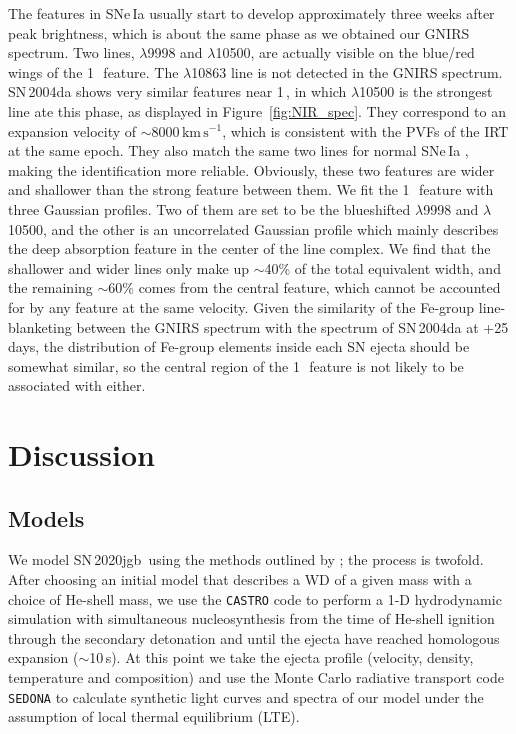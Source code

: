 \documentclass[twocolumn]{aastex631}
\newcommand{\sn}{SN\,2020jgb}
\newcommand{\kms}{$\mathrm{km}\,\mathrm{s}^{-1}$}
\newcommand{\adam}[1]{\textcolor{red}{[AAM: #1]}}
\newcommand{\chang}[1]{\textcolor{blue}{[Chang: #1]}}
\begin{document}
The  features in SNe\,Ia usually start to develop approximately three weeks after peak brightness, which is about the same phase as we obtained our GNIRS spectrum. Two  lines, $\lambda$9998 and $\lambda$10500, are actually visible on the blue/red wings of the 1\,\micron\ feature. The  $\lambda$10863 line is not detected in the GNIRS spectrum. SN\,2004da shows very similar  features near 1\,\micron, in which  $\lambda$10500 is the strongest line ate this phase, as displayed in Figure~\ref{fig:NIR_spec}. They correspond to an expansion velocity of $\sim$8000\,\kms, which is consistent with the PVFs of the  IRT at the same epoch. They also match the same two lines for normal SNe\,Ia \citep{Marion2009_NIR}, making the identification more reliable. Obviously, these two  features are wider and shallower than the strong feature between them. We fit the 1\,\micron\ feature with three Gaussian profiles. Two of them are set to be the blueshifted  $\lambda$9998 and $\lambda$10500, and the other is an uncorrelated Gaussian profile which mainly describes the deep absorption feature in the center of the line complex. We find that the shallower and wider  lines only make up $\sim$40\% of the total equivalent width, and the remaining $\sim$60\% comes from the central feature, which cannot be accounted for by any  feature at the same velocity. Given the similarity of the Fe-group line-blanketing between the GNIRS spectrum with the spectrum of SN\,2004da at +25\,days, the distribution of Fe-group elements inside each SN ejecta should be somewhat similar, so the central region of the 1\,\micron\ feature is not likely to be associated with  either.

\section{Discussion} \label{sec:discussion}
\subsection{Models} \label{sec:model}
We model \sn\ using the methods outlined by \citet{polin_observational_2019}; the process is twofold. After choosing an initial model that describes a WD of a given mass with a choice of He-shell mass, we use the \texttt{CASTRO} code \citep{Almgren_Castro_2010} to perform a 1-D hydrodynamic simulation with simultaneous nucleosynthesis from the time of He-shell ignition through the secondary detonation and until the ejecta have reached homologous expansion ($\sim$10\,s). At this point we take the ejecta profile (velocity, density, temperature and composition) and use the Monte Carlo radiative transport code \texttt{SEDONA} \citep{Kasen_Sedona_2006} to calculate synthetic light curves and spectra of our model under the assumption of local thermal equilibrium (LTE). 
\end{document}
